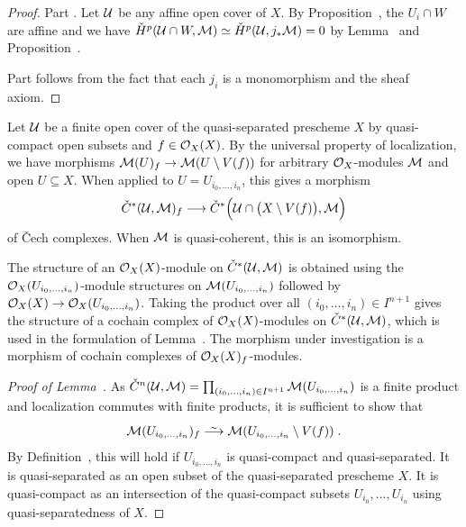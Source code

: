 \documentclass[a4paper,parskip=half,numbers=enddot, DIV=12]{scrreprt}
\newcommand{\vC}{\v{C}}
\begin{document}
\begin{proof}
	Part . Let $\mathcal{U}$ be any affine open cover of $X$. By Proposition~, the $U_i\cap W$ are affine and we have $\check{H}^p(\mathcal{U}\cap W,\mathcal{M})\simeq \check{H}^p(\mathcal{U},j_*\mathcal{M})=0$ by Lemma~ and Proposition~.
	
	Part  follows from the fact that each $j_i$ is a monomorphism and the sheaf axiom.
\end{proof}
\begin{lem}
	Let $\mathcal{U}$ be a finite open cover of the quasi-separated prescheme $X$ by quasi-compact open subsets and $f\in\mathcal{O}_X(X)$. By the universal property of localization, we have morphisms $\Mm(U)_f\morphism\Mm(U\setminus V(f))$ for arbitrary $\mathcal{O}_X$-modules $\mathcal{M}$ and open $U\subseteq X$. When applied to $U=U_{i_0,\ldots,i_n}$, this gives a morphism
	\begin{align*}
		\check{C}^*(\Uu,\Mm)_f\morphism\check{C}^*\Big(\Uu\cap\big(X\setminus V(f)\big),\Mm\Big)
	\end{align*}
	of \vC ech complexes. When $\mathcal{M}$ is quasi-coherent, this is an isomorphism.
\end{lem}
\begin{rem*}
	The structure of an $\mathcal{O}_X(X)$-module on $\check{C}^*(\mathcal{U},\mathcal{M})$ is obtained using the $\mathcal{O}_X(U_{i_0,\ldots,i_n})$-module structures on $\mathcal{M}(U_{i_0,\ldots,i_n})$ followed by $\Oo_X(X)\morphism \Oo_X(U_{i_0,\ldots,i_n})$. Taking the product over all $(i_0,\ldots,i_n)\in I^{n+1}$ gives the structure of a cochain complex of $\mathcal{O}_X(X)$-modules on $\check{C}^*(\mathcal{U},\mathcal{M})$, which is used in the formulation of Lemma~. The morphism under investigation is a morphism of cochain complexes  of $\mathcal{O}_X(X)_f$-modules.
\end{rem*}
\begin{proof}[Proof of Lemma~]
	As $\check{C}^n(\mathcal{U},\mathcal{M})=\prod_{(i_0,\ldots,i_n)\in I^{n+1}}\mathcal{M}(U_{i_0,\ldots,i_n})$ is a finite product and localization commutes with finite products, it is sufficient to show that
	\begin{align*}
		\Mm(U_{i_0,\ldots,i_n})_f\isomorphism\Mm(U_{i_0,\ldots,i_n}\setminus V(f))\;.
	\end{align*}
	By Definition~, this will hold if $U_{i_0,\ldots,i_n}$ is quasi-compact and quasi-separated. It is quasi-separated as an open subset of the quasi-separated prescheme $X$. It is quasi-compact as an intersection of the quasi-compact subsets $U_{i_0},\ldots,U_{i_n}$ using quasi-separatedness of $X$.
\end{proof}
\end{document}
